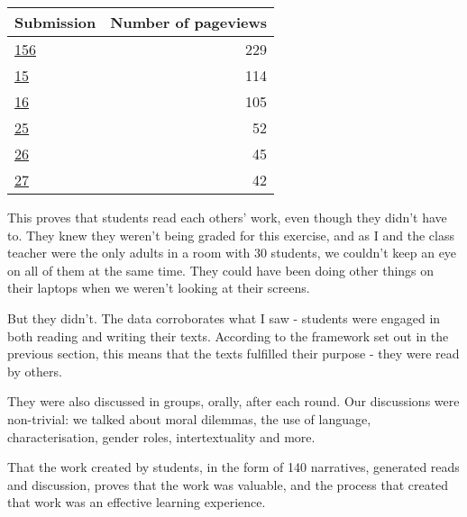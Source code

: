\begin{center}
  \begin{tabular}{ | l | r | }
    \hline
    \textbf{Submission} & \textbf{Number of pageviews}\\ \hline
    \href{http://kg.narrativeroulette.com/submission/156}{156} & 229 \\
    \href{http://kg.narrativeroulette.com/submission/15}{15} & 114 \\
    \href{http://kg.narrativeroulette.com/submission/16}{16} & 105 \\
    \href{http://kg.narrativeroulette.com/submission/25}{25} & 52 \\
    \href{http://kg.narrativeroulette.com/submission/26}{26} & 45 \\
    \href{http://kg.narrativeroulette.com/submission/27}{27}  & 42 \\
    \hline
  \end{tabular}
\end{center}

This proves that students read each others' work, even though they didn't have to. They knew they weren't being graded for this exercise, and as I and the class teacher were the only adults in a room with 30 students, we couldn't keep an eye on all of them at the same time. They could have been doing other things on their laptops when we weren't looking at their screens.

But they didn't. The data corroborates what I saw - students were engaged in both reading and writing their texts. According to the framework set out in the previous section, this means that the texts fulfilled their purpose - they were read by others. 

They were also discussed in groups, orally, after each round. Our discussions were non-trivial: we talked about moral dilemmas, the use of language, characterisation, gender roles, intertextuality and more. 

That the work created by students, in the form of 140 narratives, generated reads and discussion, proves that the work was valuable, and the process that created that work was an effective learning experience.   
